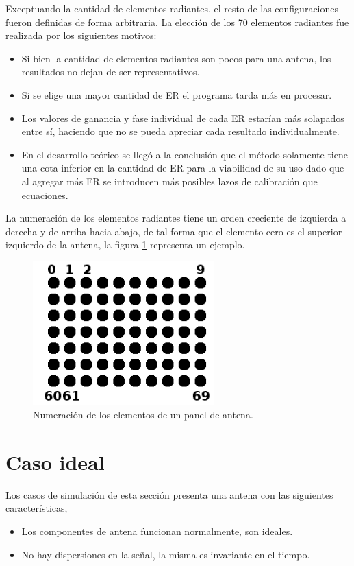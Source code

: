 Exceptuando la cantidad de elementos radiantes, el resto de las configuraciones fueron definidas de forma arbitraria. La
elección de los 70 elementos radiantes fue realizada por los siguientes motivos:
\begin{itemize}
	\item Si bien la cantidad de elementos radiantes son pocos para una antena, los resultados no dejan de ser representativos.
	\item Si se elige una mayor cantidad de ER el programa tarda más en procesar. 
	\item Los valores de ganancia y fase individual de cada ER estarían más solapados entre sí, haciendo que no se pueda apreciar
		cada resultado individualmente. 
	\item En el desarrollo teórico se llegó a la conclusión que el método solamente tiene una cota inferior en la cantidad de ER
		para la viabilidad de su uso dado que al agregar más ER se introducen más posibles lazos de calibración que ecuaciones.
\end{itemize}

La numeración de los elementos radiantes tiene un orden creciente de izquierda a derecha y de arriba hacia abajo, de tal forma
que el elemento cero es el superior izquierdo de la antena, la figura \ref{fig:arrayNumeration} representa un ejemplo.

\begin{figure}[H]
 \centering
 \includegraphics[width=7cm]{gfx/arrayNumeration.png}
 \caption{Numeración de los elementos de un panel de antena.}
 \label{fig:arrayNumeration}
\end{figure}


\section{Caso ideal}
\label{sc:withoutDispersion} 

Los casos de simulación de esta sección presenta una antena con las siguientes características,
\begin{itemize}
	\item Los componentes de antena funcionan normalmente, son ideales.
	\item No hay dispersiones en la señal, la misma es invariante en el tiempo.
\end{itemize}


